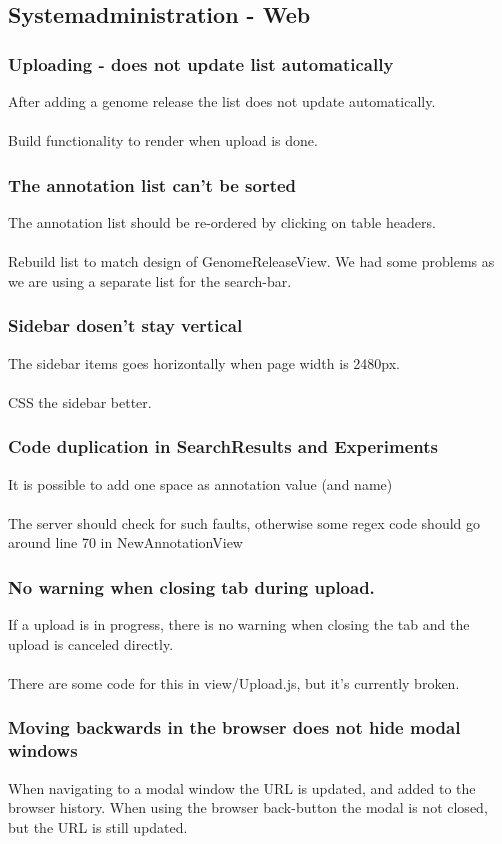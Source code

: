 \subsection{Systemadministration - Web}
\subsubsection{Uploading - does not update list automatically}
After adding a genome release the list does not update automatically. \\
\\
Build functionality to render when upload is done. 
\subsubsection{The annotation list can't be sorted}
The annotation list should be re-ordered by clicking on table headers. \\
\\
Rebuild list to match design of GenomeReleaseView. We had some problems as we are using a separate list for the search-bar.
\subsubsection{Sidebar dosen't stay vertical}
The sidebar items goes horizontally when page width is 2480px. \\
\\
CSS the sidebar better. 
\subsubsection{Code duplication in SearchResults and Experiments}
It is possible to add one space as annotation value (and name) \\
\\
The server should check for such faults, otherwise some regex code should go around line 70 in NewAnnotationView
\subsubsection{No warning when closing tab during upload.}
If a upload is in progress, there is no warning when closing the tab and the upload is canceled directly. \\
\\
There are some code for this in view/Upload.js, but it's currently broken.
\subsubsection{Moving backwards in the browser does not hide modal windows}
When navigating to a modal window the URL is updated, and added to the browser history. When using the browser back-button the modal is not closed, but the URL is still updated. \\
\\
